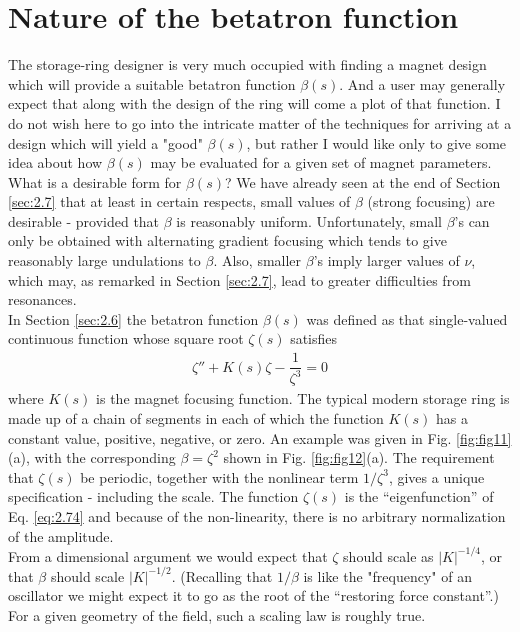 \section{Nature of the betatron function}\label{sec:2.9}

The storage-ring designer is very much occupied with finding a magnet design which will provide a suitable betatron function $\beta(s)$. And a user may generally expect that along with the design of the ring will come a plot of that function.  I do not wish here to go into the intricate matter
 of the techniques for arriving at a design which will yield a "good" $\beta(s)$, but rather I would like only to give some idea about how $\beta(s)$ may be evaluated for a given set of magnet parameters. \\
What is a desirable form for $\beta(s)$? We have already seen at the end of Section \ref{sec:2.7} that at least in certain respects, small values of $\beta$ (strong focusing) are desirable - provided that $\beta$ is reasonably uniform. Unfortunately, small $\beta$’s can only be obtained with alternating gradient focusing which tends to give reasonably large undulations to $\beta$. Also, smaller $\beta$’s imply larger values of $\nu$, which may, as remarked in Section \ref{sec:2.7}, lead to greater difficulties from resonances. \\
In Section \ref{sec:2.6} the betatron function $\beta(s)$ was defined as that single-valued continuous function whose square root $\zeta(s)$ satisfies
\begin{align} \label{eq:2.74}
	\zeta''+K(s)\zeta-\dfrac{1}{\zeta^3}=0
\end{align}
where $K(s)$ is the magnet focusing function. The typical modern storage ring is made up of a chain of segments in each of which the function $K(s)$ has a constant value, positive, negative,
 or zero. An example was given in Fig. \ref{fig:fig11}(a), with the corresponding $\beta=\zeta^2$ shown in Fig. \ref{fig:fig12}(a).
The requirement that $\zeta(s)$ be periodic, together with the nonlinear term $1/\zeta^3$, gives a unique specification - including the scale. The function $\zeta(s)$ is the “eigenfunction” of Eq. \eqref{eq:2.74} and because of the non-linearity, there is no arbitrary normalization of the amplitude. \\
From a dimensional argument we would expect that $\zeta$ should scale as $|K|^{-1/4}$, or that $\beta$ should scale $|K|^{-1/2}$. (Recalling that $1/\beta$ is like the "frequency" of an
oscillator we might expect it to go as the root of the “restoring force constant”.) For a given geometry of the field, such a scaling law is roughly true. \\
